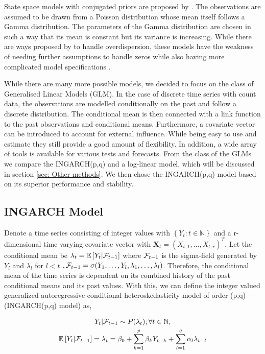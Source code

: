 State space models with conjugated priors are proposed by \cite{Harvey:1989}. The observations are assumed to be drawn from a Poisson distribution whose mean itself follows a Gamma distribution. The parameters of the Gamma distribution are chosen in such a way that its mean is constant but its variance is increasing. While there are ways proposed by \cite{Qaqish:1988} to handle overdispersion, these models have the weakness of needing further assumptions to handle zeros while also having more complicated model specifications \cite{Heinen:2003}.

While there are many more possible models, we decided to focus on the class of Generalised Linear Models (GLM). In the case of discrete time series with count data, the observations are modelled conditionally on the past and follow a discrete distribution. The conditional mean is then connected with a link function to the past observations and conditional means. Furthermore, a covariate vector can be introduced to account for external influence. While being easy to use and estimate they still provide a good amount of flexibility. In addition, a wide array of tools is available for various tests and forecasts. From the class of the GLMs we compare the INGARCH(p,q) and a log-linear model, which will be discussed in section \ref{sec: Other methods}. We then chose the INGARCH(p,q) model based on its superior performance and stability.


\subsection{INGARCH Model}
\label{sec:Ingarch Model}
Denote a time series consisting of integer values with $\left\{Y_t:t\in \mathbb{N}\right\}$ and a r-dimensional time varying covariate vector with $\textbf{X}_t=(X_{t,1},\ldots,X_{t,r})^T$. Let the conditional mean be $\lambda_t = \mathbb{E}\left[Y_t | \mathcal{F}_{t-1} \right]$ where $\mathcal{F}_{t-1}$ is the sigma-field generated by $Y_l$ and $\lambda_l$ for $l<t$ $, \mathcal{F} _{t-1}= \sigma(Y_1,\ldots,Y_l,\lambda_1, \ldots, \lambda_l)$. Therefore, the conditional mean of the time series is dependent on its combined history of the past conditional means and its past values. With this, we can define the integer valued generalized autoregressive conditional heteroskedasticity model of order (p,q) (INGARCH(p,q) model) as,

\begin{gather}
\label{eq:Ingarch model}
Y_t | \mathcal{F}_{t-1} \sim P(\lambda_t); \forall t \in \mathbb{N}, \\
\mathbb{E}\left[Y_t | \mathcal{F}_{t-1} \right] = \lambda_t = \beta_0 + \sum_{k=1}^p\beta_k Y_{t-k} + \sum_{l=1}^q\alpha_l \lambda_{t-l}
\end{gather}

